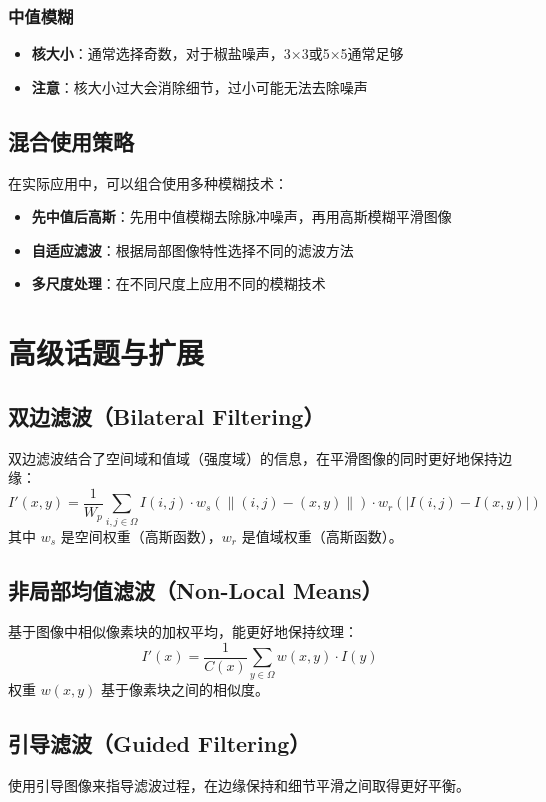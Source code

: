 \documentclass{article}
\begin{document}
\subsubsection{中值模糊}
\begin{itemize}
    \item \textbf{核大小}：通常选择奇数，对于椒盐噪声，3×3或5×5通常足够
    \item \textbf{注意}：核大小过大会消除细节，过小可能无法去除噪声
\end{itemize}

\subsection{混合使用策略}
在实际应用中，可以组合使用多种模糊技术：
\begin{itemize}
    \item \textbf{先中值后高斯}：先用中值模糊去除脉冲噪声，再用高斯模糊平滑图像
    \item \textbf{自适应滤波}：根据局部图像特性选择不同的滤波方法
    \item \textbf{多尺度处理}：在不同尺度上应用不同的模糊技术
\end{itemize}

\section{高级话题与扩展}

\subsection{双边滤波（Bilateral Filtering）}
双边滤波结合了空间域和值域（强度域）的信息，在平滑图像的同时更好地保持边缘：
\[
I'(x,y) = \frac{1}{W_p} \sum_{i,j \in \Omega} I(i,j) \cdot w_s(\|(i,j)-(x,y)\|) \cdot w_r(|I(i,j)-I(x,y)|)
\]
其中 $w_s$ 是空间权重（高斯函数），$w_r$ 是值域权重（高斯函数）。

\subsection{非局部均值滤波（Non-Local Means）}
基于图像中相似像素块的加权平均，能更好地保持纹理：
\[
I'(x) = \frac{1}{C(x)} \sum_{y \in \Omega} w(x,y) \cdot I(y)
\]
权重 $w(x,y)$ 基于像素块之间的相似度。

\subsection{引导滤波（Guided Filtering）}
使用引导图像来指导滤波过程，在边缘保持和细节平滑之间取得更好平衡。
\end{document}
